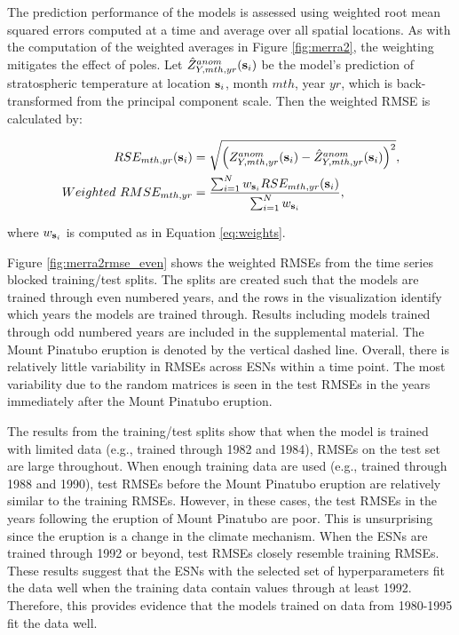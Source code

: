 \documentclass[AMS,STIX2COL]{WileyNJD-v2}
\begin{document}
The prediction performance of the models is assessed using weighted root mean squared errors computed at a time and average over all spatial locations. As with the computation of the weighted averages in Figure \ref{fig:merra2}, the weighting mitigates the effect of poles. Let $\hat{Z}^{anom}_{Y,mth,yr}({\bf s}_i)$ be the model's prediction of stratospheric temperature at location ${\bf s}_i$, month $mth$, year $yr$, which is back-transformed from the principal component scale. Then the weighted RMSE is calculated by:

\begin{align}
    RSE_{mth,yr}({\bf s}_i) &= \sqrt{\left( Z^{anom}_{Y,mth,yr}({\bf s}_i)-\hat{Z}^{anom}_{Y,mth,yr}({\bf s}_i) \right)^2}, \nonumber \\
    Weighted\ RMSE_{mth,yr} &= \frac{\sum_{i=1}^{N} w_{{\bf s}_i} RSE_{mth,yr}({\bf s}_i)}{\sum_{i=1}^{N}  w_{{\bf s}_i}}, \nonumber
\end{align}

\noindent where $w_{{\bf s}_i}$ is computed as in Equation \ref{eq:weights}.

Figure \ref{fig:merra2rmse_even} shows the weighted RMSEs from the time series blocked training/test splits. The splits are created such that the models are trained through even numbered years, and the rows in the visualization identify which years the models are trained through. Results including models trained through odd numbered years are included in the supplemental material. The Mount Pinatubo eruption is denoted by the vertical dashed line. Overall, there is relatively little variability in RMSEs across ESNs within a time point. The most variability due to the random matrices is seen in the test RMSEs in the years immediately after the Mount Pinatubo eruption.

The results from the training/test splits show that when the model is trained with limited data (e.g., trained through 1982 and 1984), RMSEs on the test set are large throughout. When enough training data are used (e.g., trained through 1988 and 1990), test RMSEs before the Mount Pinatubo eruption are relatively similar to the training RMSEs. However, in these cases, the test RMSEs in the years following the eruption of Mount Pinatubo are poor. This is unsurprising since the eruption is a change in the climate mechanism. When the ESNs are trained through 1992 or beyond, test RMSEs closely resemble training RMSEs. These results suggest that the ESNs with the selected set of hyperparameters fit the data well when the training data contain values through at least 1992. Therefore, this provides evidence that the models trained on data from 1980-1995 fit the data well.
\end{document}
